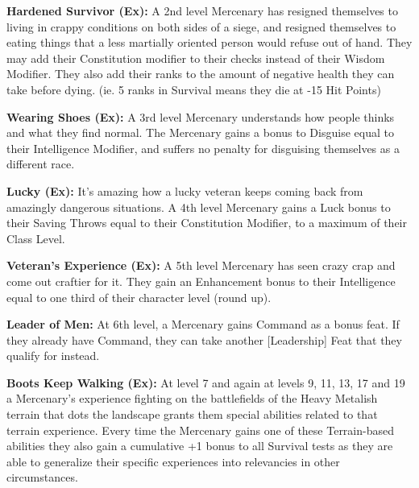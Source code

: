 \textbf{Hardened Survivor (Ex):} A 2nd level Mercenary has resigned themselves to living in crappy conditions on both sides of a siege, and resigned themselves to eating things that a less martially oriented person would refuse out of hand. They may add their Constitution modifier to their  checks instead of their Wisdom Modifier. They also add their  ranks to the amount of negative health they can take before dying. (ie. 5 ranks in Survival means they die at -15 Hit Points)

\textbf{Wearing Shoes (Ex):} A 3rd level Mercenary understands how people thinks and what they find normal. The Mercenary gains a bonus to Disguise equal to their Intelligence Modifier, and suffers no penalty for disguising themselves as a different race.

\textbf{Lucky (Ex):} It's amazing how a lucky veteran keeps coming back from amazingly dangerous situations. A 4th level Mercenary gains a Luck bonus to their Saving Throws equal to their Constitution Modifier, to a maximum of their Class Level.

\textbf{Veteran's Experience (Ex):} A 5th level Mercenary has seen crazy crap and come out craftier for it. They gain an Enhancement bonus to their Intelligence equal to one third of their character level (round up).

\textbf{Leader of Men:} At 6th level, a Mercenary gains Command as a bonus feat. If they already have Command, they can take another [Leadership] Feat that they qualify for instead.

\textbf{Boots Keep Walking (Ex):} At level 7 and again at levels 9, 11, 13, 17 and 19 a Mercenary's experience fighting on the battlefields of the Heavy Metalish terrain that dots the landscape grants them special abilities related to that terrain experience. Every time the Mercenary gains one of these Terrain-based abilities they also gain a cumulative +1 bonus to all Survival tests as they are able to generalize their specific experiences into relevancies in other circumstances.


